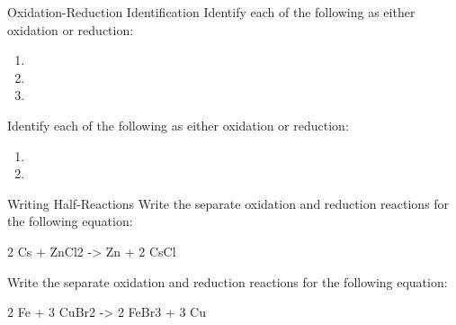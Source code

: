 \documentclass[11pt,letterpaper]{article}
\begin{document}
\begin{frame}[t]{Oxidation-Reduction Identification}
	Identify each of the following as either oxidation or reduction:

	\begin{enumerate}
		\item {}

			\bigskip

		\item {}

			\bigskip

		\item {}

			\bigskip
	\end{enumerate}
\end{frame}


\begin{onyourown}[0em]
	Identify each of the following as either oxidation or reduction:

	\begin{enumerate}
		\item {}

			\bigskip

		\item {}
			\bigskip
	\end{enumerate}
\end{onyourown}

\begin{frame}[t]{Writing Half-Reactions}
	Write the separate oxidation and reduction reactions for the following
	equation:
	\begin{reaction*}
		2 Cs\sld{} + ZnCl2\aq{} -> Zn\sld{} + 2 CsCl\aq{}
	\end{reaction*}

	\note{
		\begin{reactions*}
			2 Cs\sld{} &-> 2 Cs^{+}\sld{} + 2 \el{} \\
			Zn^{2+}\aq{} + 2 \el{} &-> Zn\sld{}
		\end{reactions*}
		}
\end{frame}

\begin{onyourown}
	Write the separate oxidation and reduction reactions for the following
	equation:
	\begin{reaction*}
		2 Fe\sld{} + 3 CuBr2\aq{} -> 2 FeBr3\aq{} + 3 Cu\sld{}
	\end{reaction*}
\end{onyourown}
\end{document}
